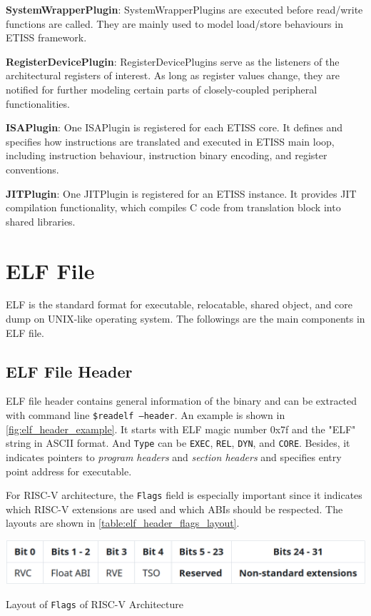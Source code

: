 \textbf{SystemWrapperPlugin}: SystemWrapperPlugins are executed before read/write functions are called. They are mainly used to model load/store behaviours in ETISS framework.

\textbf{RegisterDevicePlugin}: RegisterDevicePlugins serve as the listeners of the architectural registers of interest. As long as register values change, they are notified for further modeling certain parts of closely-coupled peripheral functionalities.

\textbf{ISAPlugin}: One ISAPlugin is registered for each ETISS core. It defines and specifies how instructions are translated and executed in ETISS main loop, including instruction behaviour, instruction binary encoding, and register conventions.

\textbf{JITPlugin}: One JITPlugin is registered for an ETISS instance. It provides \ac{JIT} compilation functionality, which compiles C code from translation block into shared libraries.

\section{ELF File}
\ac{ELF} is the standard format for executable, relocatable, shared object, and core dump on UNIX-like operating system. The followings are the main components in \ac{ELF} file.

\subsection{ELF File Header}
\label{sec:ELF}

\ac{ELF} file header contains general information of the binary and can be extracted with command line \texttt{\$readelf --header}. An example is shown in \cref{fig:elf_header_example}. It starts with \ac{ELF} magic number 0x7f and the "ELF" string in ASCII format. And \texttt{Type} can be \texttt{EXEC}, \texttt{REL}, \texttt{DYN}, and \texttt{CORE}. Besides, it indicates pointers to \textit{program headers} and \textit{section headers} and specifies entry point address for executable.

For RISC-V architecture, the \texttt{Flags} field is especially important since it indicates which RISC-V extensions are used and which ABIs should be respected. The layouts are shown in \cref{table:elf_header_flags_layout}. 

\begin{table}
    \centering
    \includegraphics[width=.85\linewidth]{figures/ELF_header_flags_layout.png}
    \caption{Layout of \texttt{Flags} of RISC-V Architecture\cite{riscv_abi}}
    \label{table:elf_header_flags_layout}
\end{table}

